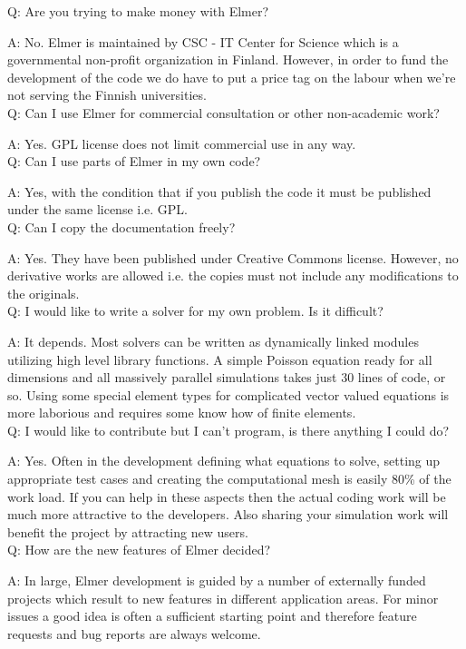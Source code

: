     Q: Are you trying to make money with Elmer?

    A: No. Elmer is maintained by CSC - IT Center for Science which is a governmental non-profit organization in Finland. However, in order to fund the development of the code we do have to put a price tag on the labour when we're not serving the Finnish universities.\\

    Q: Can I use Elmer for commercial consultation or other non-academic work?

    A: Yes. GPL license does not limit commercial use in any way.\\

    Q: Can I use parts of Elmer in my own code?

    A: Yes, with the condition that if you publish the code it must be published under the same license i.e. GPL.\\

    Q: Can I copy the documentation freely?

    A: Yes. They have been published under Creative Commons license. However, no derivative works are allowed i.e. the copies must not include any modifications to the originals.\\

    Q: I would like to write a solver for my own problem. Is it difficult?

    A: It depends. Most solvers can be written as dynamically linked modules utilizing high level library functions. A simple Poisson equation ready for all dimensions and all massively parallel simulations takes just 30 lines of code, or so. Using some special element types for complicated vector valued equations is more laborious and requires some know how of finite elements.\\

    Q: I would like to contribute but I can't program, is there anything I could do?

    A: Yes. Often in the development defining what equations to solve, setting up appropriate test cases and creating the computational mesh is easily 80\% of the work load. If you can help in these aspects then the actual coding work will be much more attractive to the developers. Also sharing your simulation work will benefit the project by attracting new users.\\

    Q: How are the new features of Elmer decided?

    A: In large, Elmer development is guided by a number of externally funded projects which result to new features in different application areas. For minor issues a good idea is often a sufficient starting point and therefore feature requests and bug reports are always welcome.


